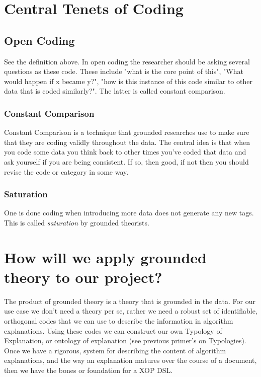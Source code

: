\documentclass[10pt, letterpaper]{article}
\begin{document}
\section*{Central Tenets of Coding}
\label{sec:org0f3ac52}

\subsection*{Open Coding}
\label{sec:org554423a}
See the definition above. In open coding the researcher should be asking
several questions as these code. These include "what is the core point of
this", "What would happen if x became y?", "how is this instance of this code
similar to other data that is coded similarly?". The latter is called
constant comparison.

\subsubsection*{Constant Comparison}
\label{sec:org8f122b3}
Constant Comparison is a technique that grounded researches use to make sure
that they are coding validly throughout the data. The central idea is that
when you code some data you think back to other times you've coded that data
and ask yourself if you are being consistent. If so, then good, if not then
you should revise the code or category in some way.

\subsubsection*{Saturation}
\label{sec:orge019f22}
One is done coding when introducing more data does not generate any new
tags. This is called \emph{saturation} by grounded theorists.

\section*{How will we apply grounded theory to our project?}
\label{sec:org6f45312}
The product of grounded theory is a theory that is grounded in the data. For
our use case we don't need a theory per se, rather we need a robust set of
identifiable, orthogonal codes that we can use to describe the information in
algorithm explanations. Using these codes we can construct our own Typology of
Explanation, or ontology of explanation (see previous primer's on Typologies).
Once we have a rigorous, system for describing the content of algorithm
explanations, and the way an explanation matures over the course of a
document, then we have the bones or foundation for a XOP DSL.
\end{document}
